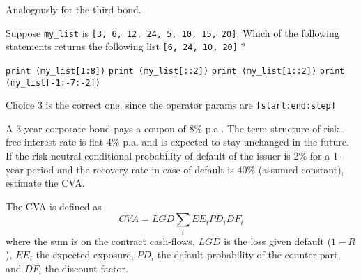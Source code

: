 \documentclass[12pt,a4paper]{exam}
\begin{document}
\begin{questions}
\begin{solution}
Analogously for the third bond.
%
%
%
%
\end{solution}

\question
Suppose \texttt{my\_list} is \texttt{[3, 6, 12, 24, 5, 10, 15, 20]}.
Which of the following statements returns the following list \texttt{[6, 24, 10, 20]} ?

\begin{checkboxes}
\choice \texttt{print (my\_list[1:8])}
\choice \texttt{print (my\_list[::2])}
\choice \texttt{print (my\_list[1::2])}
\choice \texttt{print (my\_list[-1:-7:-2])}
\end{checkboxes}
\begin{solution}
Choice 3 is the correct one, since the operator params are \texttt{[start:end:step]}
\end{solution}
\question
A 3-year corporate bond pays a coupon of 8\% p.a.. The term structure of risk-free interest rate is flat 4\% p.a. and is expected to stay unchanged in the future. If the risk-neutral conditional probability of default of the issuer is 2\% for a 1-year period and the recovery rate in case of default is 40\% (assumed constant), estimate the CVA.

\fillwithlines{3cm}
\begin{solution}
The CVA is defined as 
\begin{equation*}
	CVA = LGD\sum_i EE_i PD_i DF_i
\end{equation*}
where the sum is on the contract cash-flows, $LGD$ is the loss given default ($1-R$), $EE_i$ the expected exposure, $PD_i$ the default probability of the counter-part, and $DF_i$ the discount factor.


\end{solution}
\end{questions}
\end{document}
